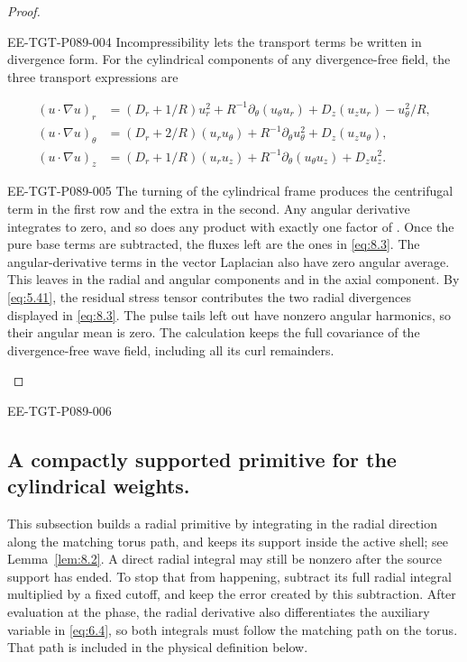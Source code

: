 \begin{proof}
\begin{EESegment}{EE-TGT-P089-004}
Incompressibility lets the transport terms be written in divergence form. For the cylindrical
components of any divergence-free field, the three transport expressions are
\end{EESegment}
\begin{align*}
  (u\cdot\nabla u)_r
    &=(D_r+1/R)u_r^2+R^{-1}\partial_\theta(u_\theta u_r)+D_z(u_z u_r)-u_\theta^2/R,\\
  (u\cdot\nabla u)_\theta
    &=(D_r+2/R)(u_r u_\theta)+R^{-1}\partial_\theta u_\theta^2+D_z(u_z u_\theta),\\
  (u\cdot\nabla u)_z
    &=(D_r+1/R)(u_r u_z)+R^{-1}\partial_\theta(u_\theta u_z)+D_z u_z^2.
\end{align*}
\begin{EESegment}{EE-TGT-P089-005}
The turning of the cylindrical frame produces the centrifugal term in the first row and the extra
 in the second. Any angular derivative integrates to zero, and
so does any product with exactly one factor of . Once the pure base terms
are subtracted, the fluxes left are the ones in \eqref{eq:8.3}. The angular-derivative terms in the
vector Laplacian also have zero angular average. This leaves
 in the radial and angular components and
 in the axial component. By \eqref{eq:5.41}, the residual stress tensor
contributes the two radial divergences displayed in \eqref{eq:8.3}. The pulse tails left out have
nonzero angular harmonics, so their angular mean is zero. The calculation keeps the full covariance
of the divergence-free wave field, including all its curl remainders.
\end{EESegment}
\end{proof}

\begin{EESegment}{EE-TGT-P089-006}
\subsection{A compactly supported primitive for the cylindrical weights.}\label{sec:8.2}
This subsection builds a radial primitive by integrating in the radial direction along the matching
torus path, and keeps its support inside the active shell; see Lemma~\ref{lem:8.2}. A direct radial
integral may still be nonzero after the source support has ended. To stop that from happening,
subtract its full radial integral multiplied by a fixed cutoff, and keep the error created by this
subtraction. After evaluation at the phase, the radial derivative also differentiates the auxiliary
variable in \eqref{eq:6.4}, so both integrals must follow the matching path on the torus. That path is
included in the physical definition below.
\end{EESegment}

